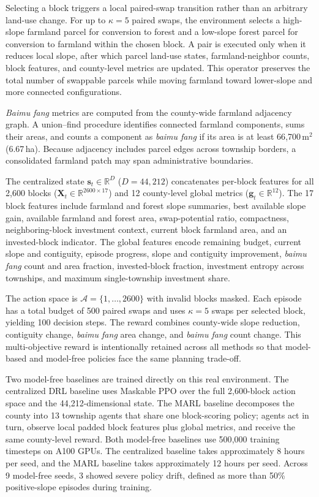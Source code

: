 \documentclass[11pt]{article}
\begin{document}
Selecting a block triggers a local paired-swap transition rather than an arbitrary land-use change. For up to $\kappa=5$ paired swaps, the environment selects a high-slope farmland parcel for conversion to forest and a low-slope forest parcel for conversion to farmland within the chosen block. A pair is executed only when it reduces local slope, after which parcel land-use states, farmland-neighbor counts, block features, and county-level metrics are updated. This operator preserves the total number of swappable parcels while moving farmland toward lower-slope and more connected configurations.

\textit{Baimu fang} metrics are computed from the county-wide farmland adjacency graph. A union--find procedure identifies connected farmland components, sums their areas, and counts a component as \textit{baimu fang} if its area is at least 66{,}700\,m$^2$ (6.67\,ha). Because adjacency includes parcel edges across township borders, a consolidated farmland patch may span administrative boundaries.

The centralized state $\mathbf{s}_t \in \mathbb{R}^{D}$ ($D = 44{,}212$) concatenates per-block features for all 2{,}600 blocks ($\mathbf{X}_t \in \mathbb{R}^{2600 \times 17}$) and 12 county-level global metrics ($\mathbf{g}_t \in \mathbb{R}^{12}$). The 17 block features include farmland and forest slope summaries, best available slope gain, available farmland and forest area, swap-potential ratio, compactness, neighboring-block investment context, current block farmland area, and an invested-block indicator. The global features encode remaining budget, current slope and contiguity, episode progress, slope and contiguity improvement, \textit{baimu fang} count and area fraction, invested-block fraction, investment entropy across townships, and maximum single-township investment share.

The action space is $\mathcal{A}=\{1,\ldots,2600\}$ with invalid blocks masked. Each episode has a total budget of 500 paired swaps and uses $\kappa=5$ swaps per selected block, yielding 100 decision steps. The reward combines county-wide slope reduction, contiguity change, \textit{baimu fang} area change, and \textit{baimu fang} count change. This multi-objective reward is intentionally retained across all methods so that model-based and model-free policies face the same planning trade-off.

Two model-free baselines are trained directly on this real environment. The centralized DRL baseline uses Maskable PPO over the full 2{,}600-block action space and the 44{,}212-dimensional state. The MARL baseline decomposes the county into 13 township agents that share one block-scoring policy; agents act in turn, observe local padded block features plus global metrics, and receive the same county-level reward. Both model-free baselines use 500{,}000 training timesteps on A100 GPUs. The centralized baseline takes approximately 8 hours per seed, and the MARL baseline takes approximately 12 hours per seed. Across 9 model-free seeds, 3 showed severe policy drift, defined as more than 50\% positive-slope episodes during training.
\end{document}
